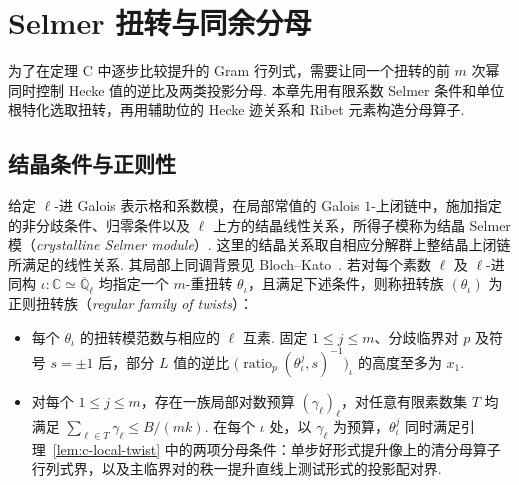 \chapter{Selmer 扭转与同余分母}
\label{chap:congruences}

\begin{chapterguide}
为了在定理 C 中逐步比较提升的 Gram 行列式，需要让同一个扭转的前 $m$ 次幂同时控制 Hecke 值的逆比及两类投影分母. 本章先用有限系数 Selmer 条件和单位根特化选取扭转，再用辅助位的 Hecke 迹关系和 Ribet 元素构造分母算子.
\end{chapterguide}

\section{结晶条件与正则性}
\label{sec:c-regularity}

\begin{definition}
\label{def:regular-twist-family}
\emitthmsource
给定 $\ell$-进 Galois 表示格和系数模，在局部常值的 Galois $1$-上闭链中，施加指定的非分歧条件、归零条件以及 $\ell$ 上方的结晶线性关系，所得子模称为结晶 Selmer 模（\emph{crystalline Selmer module}）. 这里的结晶关系取自相应分解群上整结晶上闭链所满足的线性关系. 其局部上同调背景见 Bloch--Kato~\cite[\S~3]{BlochKato1990}.
若对每个素数 $\ell$ 及 $\ell$-进同构 $\iota\colon\mathbb C\simeq\overline{\mathbb Q}_\ell$ 均指定一个 $m$-重扭转 $\theta_\iota$，且满足下述条件，则称扭转族 $(\theta_\iota)$ 为正则扭转族（\emph{regular family of twists}）：
\begin{itemize}
\item 每个 $\theta_\iota$ 的扭转模范数与相应的 $\ell$ 互素. 固定 $1\le j\le m$、分歧临界对 $p$ 及符号 $s=\pm1$ 后，部分 $L$ 值的逆比 $\bigl(\operatorname{ratio}_p(\theta_\iota^j,s)^{-1}\bigr)_\iota$ 的高度至多为 $x_1$.
\item 对每个 $1\le j\le m$，存在一族局部对数预算 $(\gamma_\ell)_\ell$，对任意有限素数集 $T$ 均满足 $\sum_{\ell\in T}\gamma_\ell\le B/(mk)$. 在每个 $\iota$ 处，以 $\gamma_\ell$ 为预算，$\theta_\iota^j$ 同时满足引理~\ref{lem:c-local-twist} 中的两项分母条件：单步好形式提升像上的清分母算子行列式界，以及主临界对的秩一提升直线上测试形式的投影配对界.
\end{itemize}
\end{definition}

